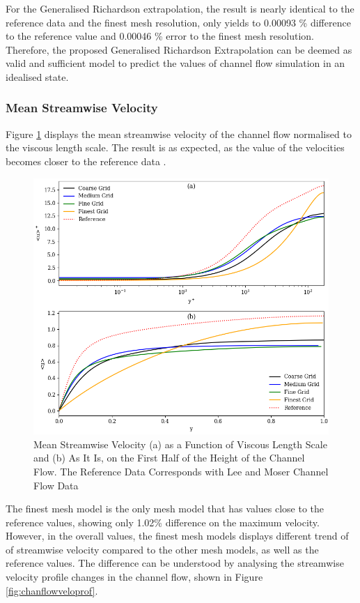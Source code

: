 For the Generalised Richardson extrapolation, the result is nearly identical to the reference data and the finest mesh resolution, only yields to 0.00093 \% difference to the reference value and 0.00046 \% error to the finest mesh resolution. Therefore, the proposed Generalised Richardson Extrapolation can be deemed as valid and sufficient model to predict the values of channel flow simulation in an idealised state.

\subsubsection{Mean Streamwise Velocity}
\label{sec:XVelo}
Figure \ref{fig:upyp} displays the mean streamwise velocity of the channel flow normalised to the viscous length scale. The result is as expected, as the value of the velocities becomes closer to the reference data \cite{Lee_Moser_2015}.
\begin{figure}[h!]
	\centering
	\includegraphics[width=0.9\linewidth]{Figures/upyp}
	\caption[Mean Streamwise Velocity]{Mean Streamwise Velocity (a) as a Function of Viscous Length Scale and (b) As It Is, on the First Half of the Height of the Channel Flow. The Reference Data Corresponds with Lee and Moser Channel Flow Data~\cite{Lee_Moser_2015}}
	\label{fig:upyp}
\end{figure}

The finest mesh model is the only mesh model that has values close to the reference values, showing only 1.02\% difference on the maximum velocity. However, in the overall values, the finest mesh models displays different trend of of streamwise velocity compared to the other mesh models, as well as the reference values. The difference can be understood by analysing the streamwise velocity profile changes in the channel flow, shown in Figure \ref{fig:chanflowveloprof}.

